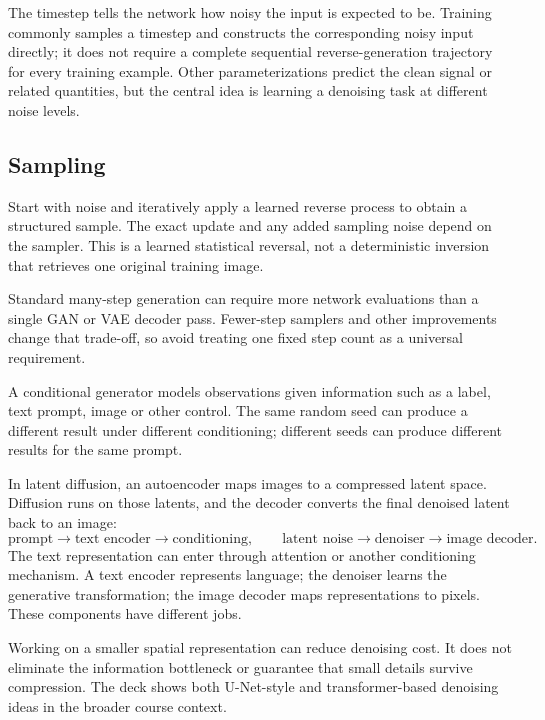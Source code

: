 \documentclass[11pt]{article}
\begin{document}
The timestep tells the network how noisy the input is expected to be. Training commonly samples a timestep and constructs the corresponding noisy input directly; it does not require a complete sequential reverse-generation trajectory for every training example. Other parameterizations predict the clean signal or related quantities, but the central idea is learning a denoising task at different noise levels.

\subsection{Sampling}
Start with noise and iteratively apply a learned reverse process to obtain a structured sample. The exact update and any added sampling noise depend on the sampler. This is a learned statistical reversal, not a deterministic inversion that retrieves one original training image.

Standard many-step generation can require more network evaluations than a single GAN or VAE decoder pass. Fewer-step samplers and other improvements change that trade-off, so avoid treating one fixed step count as a universal requirement.

A conditional generator models observations given information such as a label, text prompt, image or other control. The same random seed can produce a different result under different conditioning; different seeds can produce different results for the same prompt.

In latent diffusion, an autoencoder maps images to a compressed latent space. Diffusion runs on those latents, and the decoder converts the final denoised latent back to an image:
\[
\text{prompt}\to\text{text encoder}\to\text{conditioning},\qquad
\text{latent noise}\to\text{denoiser}\to\text{image decoder}.
\]
The text representation can enter through attention or another conditioning mechanism. A text encoder represents language; the denoiser learns the generative transformation; the image decoder maps representations to pixels. These components have different jobs.

Working on a smaller spatial representation can reduce denoising cost. It does not eliminate the information bottleneck or guarantee that small details survive compression. The deck shows both U-Net-style and transformer-based denoising ideas in the broader course context.
\end{document}
